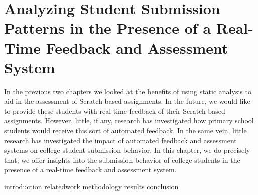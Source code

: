 \chapter{Analyzing Student Submission Patterns in the Presence of a Real-Time
  Feedback and Assessment System}
\label{chap:feedback}

\def\currentprefix{feedback}

In the previous two chapters we looked at the benefits of using static analysis
to aid in the assessment of Scratch-based assignments. In the future, we would
like to provide these students with real-time feedback of their Scratch-based
assignments. However, little, if any, research has investigated how primary
school students would receive this sort of automated feedback. In the same
vein, little research has investigated the impact of automated feedback and
assessment systems on college student submission behavior. In this chapter, we
do precisely that; we offer insights into the submission behavior of college
students in the presence of a real-time feedback and assessment system.

{introduction}
{relatedwork}
{methodology}
{results}
{conclusion}
